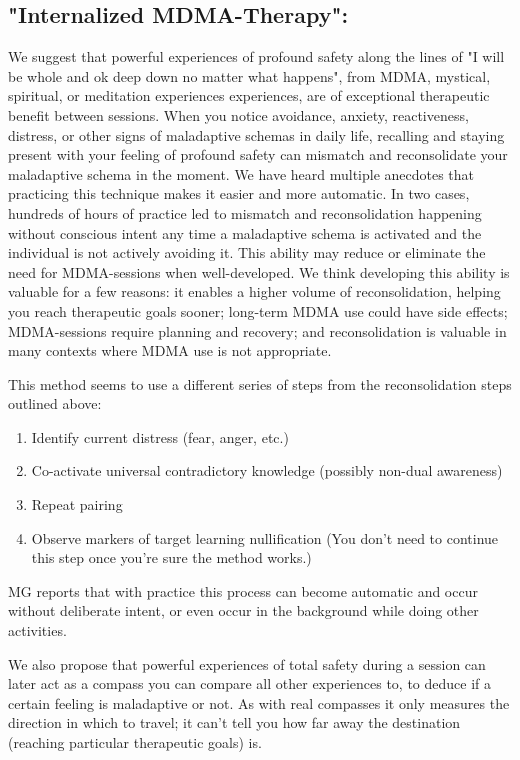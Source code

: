 \documentclass[12pt,letterpaper]{book}
\begin{document}
\subsection*{"Internalized MDMA-Therapy":}
We suggest that powerful experiences of profound safety along the lines of "I will be whole and ok deep down no matter what happens", from MDMA, mystical, spiritual, or meditation experiences experiences, are of exceptional therapeutic benefit between sessions. When you notice avoidance, anxiety, reactiveness, distress, or other signs of maladaptive schemas in daily life, recalling and staying present with your feeling of profound safety can mismatch and reconsolidate your maladaptive schema in the moment. We have heard multiple anecdotes that practicing this technique makes it easier and more automatic. In two cases, hundreds of hours of practice led to mismatch and reconsolidation happening without conscious intent any time a maladaptive schema is activated and the individual is not actively avoiding it. This ability may reduce or eliminate the need for MDMA-sessions when well-developed. We think developing this ability is valuable for a few reasons: it enables a higher volume of reconsolidation, helping you reach therapeutic goals sooner; long-term MDMA use could have side effects; MDMA-sessions require planning and recovery; and reconsolidation is valuable in many contexts where MDMA use is not appropriate.

This method seems to use a different series of steps from the reconsolidation steps outlined above:
\begin{enumerate}
    \item Identify current distress (fear, anger, etc.)
    \item Co-activate universal contradictory knowledge (possibly non-dual awareness)
    \item Repeat pairing
    \item Observe markers of target learning nullification (You don't need to continue this step once you're sure the method works.)
\end{enumerate}
MG reports that with practice this process can become automatic and occur without deliberate intent, or even occur in the background while doing other activities.

We also propose that powerful experiences of total safety during a session can later act as a compass you can compare all other experiences to, to deduce if a certain feeling is maladaptive or not. As with real compasses it only measures the direction in which to travel; it can't tell you how far away the destination (reaching particular therapeutic goals) is.
\end{document}
